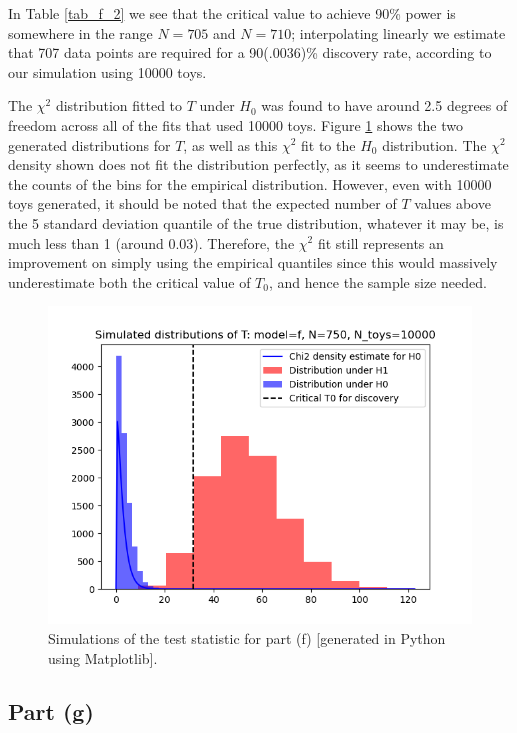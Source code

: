 \documentclass[12pt]{article}
\begin{document}
In Table \ref{tab_f_2} we see that the critical value to achieve 90\% power is somewhere in the range $N=705$ and $N=710$; interpolating linearly we estimate that 707 data points are required for a 90(.0036)\% discovery rate, according to our simulation using 10000 toys.

The $\chi^2$ distribution fitted to $T$ under $H_0$ was found to have around 2.5 degrees of freedom across all of the fits that used 10000 toys.
Figure \ref{part_f_plot} shows the two generated distributions for $T$, as well as this $\chi^2$ fit to the $H_0$ distribution.
The $\chi^2$ density shown does not fit the distribution perfectly, as it seems to underestimate the counts of the bins for the empirical distribution.
However, even with 10000 toys generated, it should be noted that the expected number of $T$ values above the 5 standard deviation quantile of the true distribution, whatever it may be, is much less than 1 (around 0.03).
Therefore, the $\chi^2$ fit still represents an improvement on simply using the empirical quantiles since this would massively underestimate both the critical value of $T_0$, and hence the sample size needed.

\begin{figure}[hbt]
  \includegraphics[scale=0.8]{T_distributions_f_750_10000.png}
  \caption{Simulations of the test statistic for part (f) [generated in Python using Matplotlib].}
  \label{part_f_plot}
\end{figure}

\subsection*{Part (g)}
\end{document}
